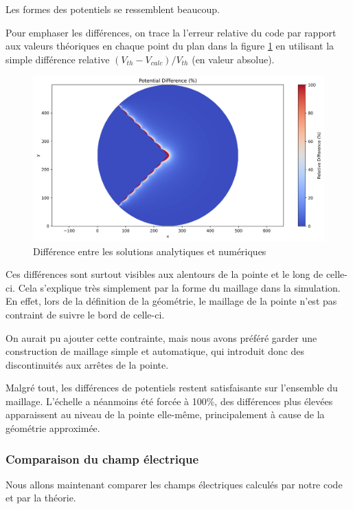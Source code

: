 \documentclass{article}
\begin{document}
Les formes des potentiels se ressemblent beaucoup.

Pour emphaser les différences, on trace la l'erreur relative
du code par rapport aux valeurs théoriques en chaque point du plan
dans la figure \ref{fig:diff} en utilisant la simple différence
relative $(V_{th} - V_{calc}) / V_{th}$ (en valeur absolue).

\begin{figure}[!h]
    \centering
    \includegraphics[scale=0.5]{img/difference.png}
    \caption{Différence entre les solutions analytiques et numériques}
    \label{fig:diff}
\end{figure}

Ces différences sont surtout visibles aux alentours de la pointe
et le long de celle-ci. Cela s'explique très simplement par
la forme du maillage dans la simulation. En effet, lors de la
définition de la géométrie, le maillage de la pointe n'est pas
contraint de suivre le bord de celle-ci.

On aurait pu ajouter
cette contrainte, mais nous avons préféré garder une construction
de maillage simple et automatique, qui introduit donc des 
discontinuités aux arrêtes de la pointe.

Malgré tout, les différences de potentiels restent satisfaisante
sur l'ensemble du maillage. L'échelle a néanmoins
été forcée à 100\%, des différences plus élevées apparaissent au niveau
de la pointe elle-même, principalement à cause de la géométrie
approximée.

\newpage

\subsubsection{Comparaison du champ électrique}

Nous allons maintenant comparer les champs électriques
calculés par notre code et par la théorie.
\end{document}
